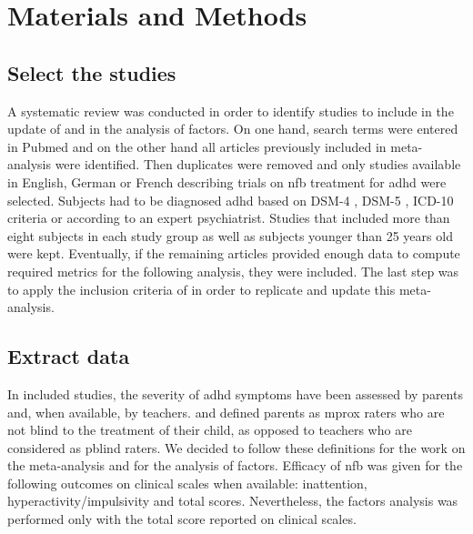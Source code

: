 

\section{Materials and Methods}

\subsection{Select the studies}

A systematic review was conducted in order to identify studies to include in the update of \citet{Cortese2016} and in the analysis of factors. 
On one hand, search terms were entered in Pubmed and on the other hand all articles previously included in meta-analysis were identified. 
Then duplicates were removed and only studies available in English, German or French describing trials on \gls{nfb} treatment for \gls{adhd} 
were selected. Subjects had to be diagnosed \gls{adhd} based on DSM-4 \citep{DSM-4}, DSM-5 \citep{DSM-5}, ICD-10 \citep{ICD101993} criteria or 
according to an expert psychiatrist. Studies that included more than eight subjects in each study group as well as subjects younger than 
25 years old were kept. Eventually, if the remaining articles provided enough data to compute required metrics for the following analysis, they were 
included. The last step was to apply the inclusion criteria of \citet{Cortese2016} in order to replicate and update this meta-analysis.  

\subsection{Extract data} 

In included studies, the severity of \gls{adhd} symptoms have been assessed by parents and, when available, by teachers. \citet{Cortese2016} 
and \citet{Micoulaud2014} defined parents as \gls{mprox} raters who are not blind to the treatment of their child, as opposed to 
teachers who are considered as \gls{pblind} raters. We decided to follow these definitions for the work on the meta-analysis and for the 
analysis of factors. Efficacy of \gls{nfb} was given for the following outcomes on clinical scales when available: inattention, 
hyperactivity/impulsivity and total scores. Nevertheless, the factors analysis was performed only with the total score reported on clinical scales.

